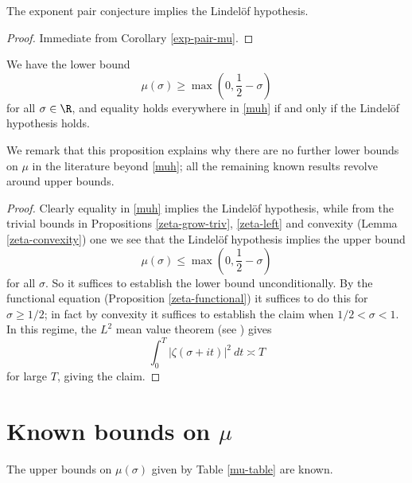 
\begin{lemma}\label{exp-pair_implies_lindelof}  The exponent pair conjecture implies the Lindel\"of hypothesis.
\end{lemma}

\begin{proof} Immediate from Corollary \ref{exp-pair-mu}.
\end{proof}

\begin{proposition}\label{mu-conj}  We have the lower bound
\begin{equation}\label{muh}
    \mu(\sigma) \geq \max\left(0, \frac{1}{2}-\sigma\right)
\end{equation}
for all $\sigma \in \R$, and equality holds everywhere in \eqref{muh} if and only if the Lindel\"of hypothesis holds.
\end{proposition}

We remark that this proposition explains why there are no further lower bounds on $\mu$ in the literature beyond \eqref{muh}; all the remaining known results revolve around upper bounds.

\begin{proof}  Clearly equality in \eqref{muh} implies the Lindel\"of hypothesis, while from the trivial bounds in Propositions \ref{zeta-grow-triv}, \ref{zeta-left} and convexity (Lemma \ref{zeta-convexity}) one we see that the Lindel\"of hypothesis implies the upper bound
$$     \mu(\sigma) \leq \max\left(0, \frac{1}{2}-\sigma\right)$$
for all $\sigma$.  So it suffices to establish the lower bound unconditionally.  By the functional equation (Proposition \ref{zeta-functional}) it suffices to do this for $\sigma \geq 1/2$; in fact by convexity it suffices to establish the claim when $1/2 < \sigma < 1$.  In this regime, the $L^2$ mean value theorem (see \cite[Theorem 1.11]{ivic}) gives
$$ \int_0^T |\zeta(\sigma+it)|^2\ dt \asymp T$$
for large $T$, giving the claim.
\end{proof}

\section{Known bounds on \texorpdfstring{$\mu$}{mu}}

\begin{theorem}\label{mu-hist}  The upper bounds on $\mu(\sigma)$ given by Table \ref{mu-table} are known.
\end{theorem}

